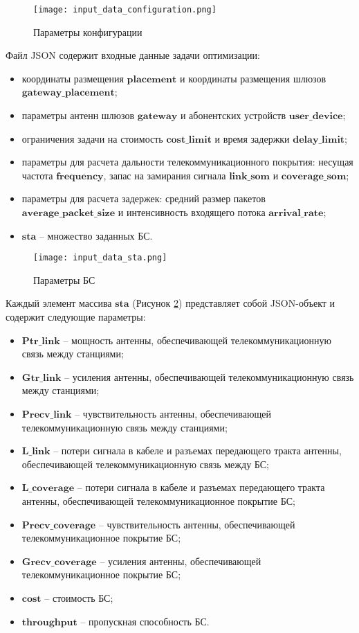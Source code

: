 \begin{figure}[h!]
  \centering
   \texttt{[image: input\_data\_configuration.png]}
\caption{Параметры конфигурации}
\label{fig:part4_input_data_configuration}
\end{figure}

Файл JSON содержит входные данные задачи оптимизации: 
\begin{itemize}
  \item координаты размещения $\textbf{placement}$ и координаты размещения шлюзов $\textbf{gateway\_placement}$;
  \item  параметры антенн шлюзов $\textbf{gateway}$ и абонентских устройств $\textbf{user\_device}$;
  \item ограничения задачи на стоимость $\textbf{cost\_limit}$ и время задержки $\textbf{delay\_limit}$;
  \item параметры для расчета дальности телекоммуникационного покрытия: несущая частота $\textbf{frequency}$, запас на замирания сигнала $\textbf{link\_som}$ и $\textbf{coverage\_som}$;
  \item параметры для расчета задержек: средний размер пакетов $\textbf{average\_packet\_size}$ и интенсивность входящего потока $\textbf{arrival\_rate}$;
  \item $\textbf{sta}$ -- множество заданных БС.
\end{itemize}

\begin{figure}[h!]
  \centering
   \texttt{[image: input\_data\_sta.png]}
\caption{Параметры БС}
\label{fig:part4_input_data_sta}
\end{figure}

Каждый элемент массива $\textbf{sta}$ (Рисунок \cref{fig:part4_input_data_sta}) представляет собой JSON-объект и содержит следующие параметры:
\begin{itemize}
  \item $\textbf{Ptr\_link}$ -- мощность антенны, обеспечивающей телекоммуникационную связь между станциями;
  \item $\textbf{Gtr\_link}$ -- усиления антенны, обеспечивающей телекоммуникационную связь между станциями;
  \item $\textbf{Precv\_link}$ -- чувствительность антенны, обеспечивающей телекоммуникационную связь между станциями;
  \item $\textbf{L\_link}$ -- потери сигнала в кабеле и разъемах передающего тракта антенны, обеспечивающей телекоммуникационную связь между БС;
  \item $\textbf{L\_coverage}$ -- потери сигнала в кабеле и разъемах передающего тракта антенны, обеспечивающей телекоммуникационное покрытие БС;
  \item $\textbf{Precv\_coverage}$ -- чувствительность антенны, обеспечивающей телекоммуникационное покрытие БС;
  \item $\textbf{Grecv\_coverage}$ -- усиления антенны, обеспечивающей телекоммуникационное покрытие БС;
  \item $\textbf{cost}$ -- стоимость БС;
  \item $\textbf{throughput}$ -- пропускная способность БС.
\end{itemize}



